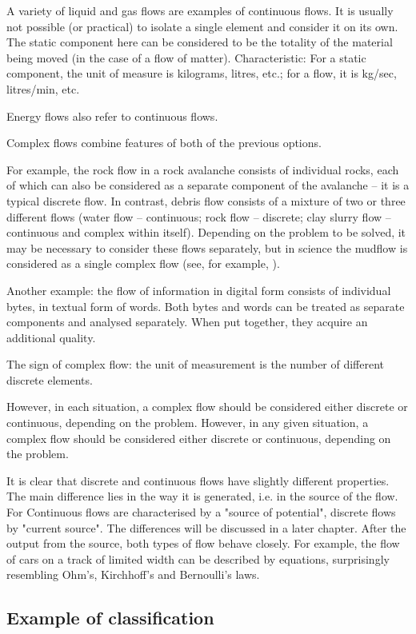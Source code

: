 \documentclass[a4paper,11pt]{article}
\begin{document}
A variety of liquid and gas flows are examples of continuous flows. It is
usually not possible (or practical) to isolate a single element and consider
it on its own. The static component here can be considered to be the totality
of the material being moved (in the case of a flow of matter). Characteristic:
For a static component, the unit of measure is kilograms, litres, etc.; for a
flow, it is kg/sec, litres/min, etc.

Energy flows also refer to continuous flows.

Complex flows combine features of both of the previous options.

For example, the rock flow in a rock avalanche consists of individual rocks,
each of which can also be considered as a separate component of the avalanche
-- it is a typical discrete flow. In contrast, debris flow consists of a
mixture of two or three different flows (water flow -- continuous; rock flow
-- discrete; clay slurry flow -- continuous and complex within itself).
Depending on the problem to be solved, it may be necessary to consider these
flows separately, but in science the mudflow is considered as a single complex
flow (see, for example, \cite{B18}).

Another example: the flow of information in digital form consists of
individual bytes, in textual form of words. Both bytes and words can be
treated as separate components and analysed separately. When put together,
they acquire an additional quality.

The sign of complex flow: the unit of measurement is the number of different
discrete elements.

However, in each situation, a complex flow should be considered either
discrete or continuous, depending on the problem. However, in any given
situation, a complex flow should be considered either discrete or continuous,
depending on the problem.

It is clear that discrete and continuous flows have slightly different
properties.  The main difference lies in the way it is generated, i.e. in the
source of the flow. For Continuous flows are characterised by a "source of
potential", discrete flows by "current source". The differences will be
discussed in a later chapter. After the output from the source, both types of
flow behave closely. For example, the flow of cars on a track of limited width
can be described by equations, surprisingly resembling Ohm's, Kirchhoff's and
Bernoulli's laws.

\subsection{Example of classification}
\end{document}
